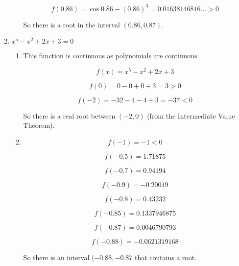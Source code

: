\documentclass{article}
\begin{document}
\begin{enumerate}
\begin{enumerate}
				$$f(0.86) = \cos 0.86 - (0.86)^3 = 0.01638146816... > 0$$

				So there is a root in the interval $(0.86,0.87)$.
			\end{enumerate}

			\item $x^5 - x^2 + 2x + 3 = 0$

			\begin{enumerate}
				\item

				This function is continuous as polynomials are continuous.

				$$f(x) = x^5 - x^2 + 2x + 3$$

				$$f(0) = 0 - 0 + 0 + 3 = 3 > 0$$

				$$f(-2) = -32 - 4 - 4 + 3 = -37 < 0$$

				So there is a real root between $(-2, 0)$ (from the Intermediate Value
				Theorem).	

				\item

				$$f(-1) = -1 < 0$$

				$$f(-0.5) = 1.71875$$

				$$f(-0.7) = 0.94194$$

				$$f(-0.9) = -0.20049$$

				$$f(-0.8) = 0.43232$$

				$$f(-0.85) = 0.1337946875$$

				$$f(-0.87) = 0.0046790793$$

				$$f(-0.88) = -0.0621319168$$

				So there is an interval $(-0.88, -0.87$ that contains a root.
			\end{enumerate}
	\end{enumerate}
\end{document}
